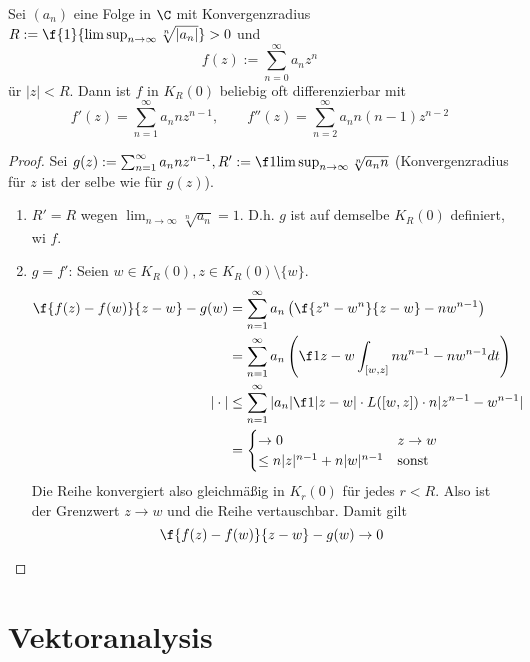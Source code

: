 \documentclass[a4paper,10pt]{scrartcl}
\begin{document}
\begin{st}
	Sei $(a_n)$ eine Folge in $\C$ mit Konvergenzradius $R:= \f {1}{\limsup_{n\to \infty}\sqrt[n]{|a_n|}}>0$ und 
	\[
		f(z) := \sum_{n=0}^\infty a_n z^n
	\]
	ür $|z|<R$.
	Dann ist $f$ in $K_R(0)$ beliebig oft differenzierbar mit
	\[
		f'(z) = \sum_{n=1}^\infty a_n nz^{n-1}, \qquad f''(z) = \sum_{n=2}^\infty a_nn(n-1)z^{n-2}
	\]
	\begin{proof}
		Sei $g(z) := \sum_{n=1}^{\infty}a_n nz^{n-1}, R':= \f 1{\limsup_{n\to \infty}\sqrt[n]{a_n n}}$ (Konvergenzradius für $z$ ist der selbe wie für $g(z)$).
		\begin{enumerate}[1)]
			\item 
				$R'=R$ wegen $\lim_{n\to \infty} \sqrt[n]{a_n} = 1$.
				D.h. $g$ ist auf demselbe $K_R(0)$ definiert, wi $f$.
			\item
				$g=f'$: Seien $w\in K_R(0), z\in K_R(0)\setminus \{w\}$.
				\begin{align*}
					\f {f(z) -f(w)}{z-w} - g(w) &= \sum_{n=1}^\infty a_n \left( \f {z^n-w^n}{z-w} - nw^{n-1}\right) \\
					&= \sum_{n=1}^\infty a_n \left( \f 1{z-w}\int_{[w,z]}nu^{n-1}-nw^{n-1}dt\right) \\
					|\cdot| &\le \sum_{n=1}^\infty |a_n| \f 1{|z-w|} \cdot L([w,z]) \cdot n|z^{n-1}-w^{n-1}| \\
					&= \begin{cases} \to 0  & z\to w\\
						\le n|z|^{n-1}+ n|w|^{n-1} & \text{sonst}
					\end{cases}
				\end{align*}
				Die Reihe konvergiert also gleichmäßig in $K_r(0)$ für jedes $r<R$.
				Also ist der Grenzwert $z\to w$ und die Reihe vertauschbar.
				Damit gilt
				\[
					\f {f(z) -f(w)}{z-w}- g(w) \to 0
				\]
		\end{enumerate}
	\end{proof}
\end{st}
\section{Vektoranalysis}
\end{document}

